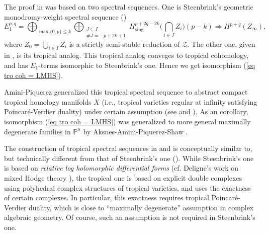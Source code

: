 \documentclass[12pt,a4]{amsart}
\def\P{\mathbb{P}}
\def\sing{\mathop{\mathrm{sing}}\nolimits}
\numberwithin{equation}{section}
\numberwithin{figure}{section}
\begin{document}
  The proof in \cite{ItenbergKatzarkovMikhalkinZharkovTropicalhomology2019} 
  was based on two spectral sequences.
   One is Steenbrink's geometric monodromy-weight spectral sequence (\cite[Corollary 4.20]{SteenbrinkLimitsofHodgestructures1976})
   $$ E_1^{p,q} 
      = \bigoplus_{ \max \{ 0, p \} \leq k }
        \bigoplus_{\substack{J \subset I \\ \# J = -p +2k +1}}
      H^{p+2q-2k}_{\sing} \big( \bigcap_{i \in J}  Z_i  \big) (p-k) 
      \Rightarrow 
      H^{p+q} (Z_{\infty}), 
   $$ 
    where  $Z_0 = \bigcup_{i \in I} Z_i $ is 
    a strictly semi-stable reduction 
    of $\mathcal{Z}$.
   The other one, given in \cite{ItenbergKatzarkovMikhalkinZharkovTropicalhomology2019},
   is its tropical analog.
   This tropical analog  conveges to tropical cohomology, and has $E_1$-terms isomorphic to Steenbrink's one.
   Hence we get isomorphism (\ref{eq tro coh = LMHS}).


     Amini-Piquerez \cite{AminiPiquerezHodgetheoryfortropicalvarieties2020} 
    generalized 
   this tropical spectral sequence to 
   abstract compact tropical homology manifolds $X $
   (i.e., tropical varieties regular at infinity 
    satisfying Poincar\'{e}-Verdier duality) 
    under certain assumption (see  and ).
     As an corollary, 
  isomorphism (\ref{eq tro coh = LMHS}) was generalized to  
   more general maximally degenerate families in $\P^n$
   by Aksnes-Amini-Piquerez-Shaw  
   \cite{AksnesAminiPiquerezShawCOHOMOLOGICALLYTROPICALVARIETIES2025}.


  The construction of tropical spectral sequences
   in \cite{ItenbergKatzarkovMikhalkinZharkovTropicalhomology2019} and 
   \cite{AminiPiquerezHodgetheoryfortropicalvarieties2020}
   is conceptually similar to, but technically different from that of Steenbrink's one (\cite[Corollary 4.20]{SteenbrinkLimitsofHodgestructures1976}).
  While Steenbrink's one 
    is based on  
    \emph{relative log holomorphic differential forms} 
    (cf. Deligne's work on mixed Hodge theory \cite{DeligneThoriedeHodgeII1972}), 
  the tropical one 
   is based on explicit double complexes using polyhedral complex structures of tropical varieties,
   and 
   uses 
     the exactness of certain complexes. 
     In particular, 
     this exactness 
     requires 
    tropical Poincar\'{e}-Verdier duality, 
    which is close to 
    ``maximally degenerate'' assumption in 
     complex algebraic geometry.
     Of course, 
    such an assumption is not required in Steenbrink's one.
\end{document}
